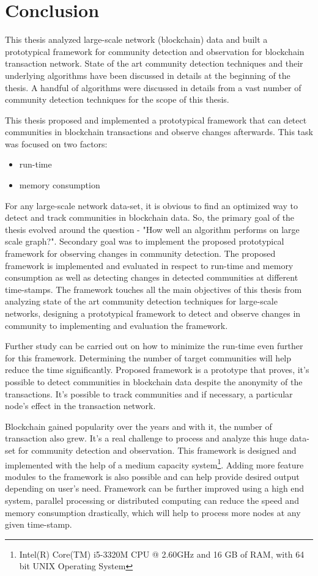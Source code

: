 \chapter{Conclusion}\label{cha:conclusion}

This thesis analyzed large-scale network (blockchain) data and built a prototypical framework for community detection and observation for blockchain transaction network. State of the art community detection techniques and their underlying algorithms have been discussed in details at the beginning of the thesis. A handful of algorithms were discussed in details from a vast number of community detection techniques for the scope of this thesis.

This thesis proposed and implemented a prototypical framework that can detect communities in blockchain transactions and observe changes afterwards. This task was focused on two factors: 
\begin{itemize}
	\item run-time
	\item memory consumption
\end{itemize}
\noindent For any large-scale network data-set, it is obvious to find an optimized way to detect and track communities in blockchain data. So, the primary goal of the thesis evolved around the question - "How well an algorithm performs on large scale graph?". Secondary goal was to implement the proposed prototypical framework for observing changes in community detection. The proposed framework is implemented and evaluated in respect to run-time and memory consumption as well as detecting changes in detected communities at different time-stamps. The framework touches all the main objectives of this thesis from analyzing state of the art community detection techniques for large-scale networks, designing a prototypical framework to detect and observe changes in community to implementing and evaluation the framework.

Further study can be carried out on how to minimize the run-time even further for this framework. Determining the number of target communities will help reduce the time significantly. Proposed framework is a prototype that proves, it's possible to detect communities in blockchain data despite the anonymity of the transactions. It's possible to track communities and if necessary, a particular node's effect in the transaction network.

Blockchain gained popularity over the years and with it, the number of transaction also grew. It's a real challenge to process and analyze this huge data-set for community detection and observation. This framework is designed and implemented with the help of a medium capacity system\footnote{Intel(R) Core(TM) i5-3320M CPU @ 2.60GHz and 16 GB of RAM, with 64 bit UNIX Operating System}. Adding more feature modules to the framework is also possible and can help provide desired output depending on user's need. Framework can be further improved using a high end system, parallel processing or distributed computing can reduce the speed and memory consumption drastically, which will help to process more nodes at any given time-stamp.

